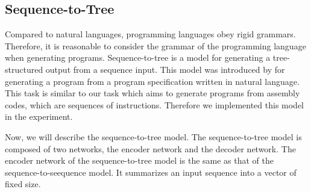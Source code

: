 \documentclass[11pt]{jarticle}
\begin{document}











\subsection{Sequence-to-Tree}
Compared to natural languages, programming languages obey rigid grammars. %
Therefore, it is reasonable to consider the grammar of the programming language when generating programs.
Sequence-to-tree is a model for generating a tree-structured output from a sequence input. 
This model was introduced by \citet{Seq2Tree} for generating a program from a program specification written in natural language. 
This task is similar to our task which aims to generate programs from assembly codes, which are sequences of instructions.
Therefore we implemented this model in the experiment.

Now, we will describe the sequence-to-tree model.
The sequence-to-tree model is composed of two networks, the encoder network and the decoder network.
The encoder network of the sequence-to-tree model is the same as that of the sequence-to-seequence model. 
It summarizes an input sequence into a vector of fixed size.
\end{document}
